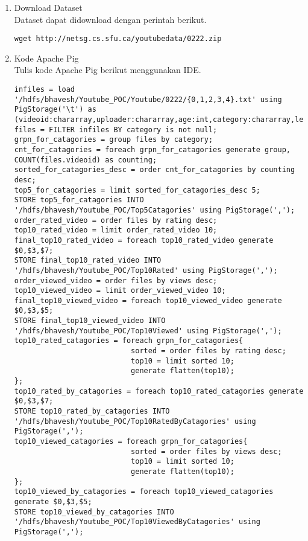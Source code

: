 \documentclass[a4paper]{tufte-handout}
\begin{document}
\begin{enumerate}
\item Download Dataset \\
Dataset dapat didownload dengan perintah berikut.

{\tt wget http://netsg.cs.sfu.ca/youtubedata/0222.zip}

\item Kode Apache Pig \\
Tulis kode Apache Pig berikut menggunakan IDE.

\begin{lstlisting}
infiles = load '/hdfs/bhavesh/Youtube_POC/Youtube/0222/{0,1,2,3,4}.txt' using PigStorage('\t') as 
(videoid:chararray,uploader:chararray,age:int,category:chararray,length:int,views:int,rate:int,rating:int,comments:int,related_id:chararray);
files = FILTER infiles BY category is not null;
grpn_for_catagories = group files by category;
cnt_for_catagories = foreach grpn_for_catagories generate group, COUNT(files.videoid) as counting;
sorted_for_catagories_desc = order cnt_for_catagories by counting desc;
top5_for_catagories = limit sorted_for_catagories_desc 5;
STORE top5_for_catagories INTO  '/hdfs/bhavesh/Youtube_POC/Top5Catagories' using PigStorage(',');
order_rated_video = order files by rating desc;
top10_rated_video = limit order_rated_video 10;
final_top10_rated_video = foreach top10_rated_video generate $0,$3,$7;
STORE final_top10_rated_video INTO '/hdfs/bhavesh/Youtube_POC/Top10Rated' using PigStorage(',');
order_viewed_video = order files by views desc;
top10_viewed_video = limit order_viewed_video 10;
final_top10_viewed_video = foreach top10_viewed_video generate $0,$3,$5;
STORE final_top10_viewed_video INTO '/hdfs/bhavesh/Youtube_POC/Top10Viewed' using PigStorage(',');
top10_rated_catagories = foreach grpn_for_catagories{
                           sorted = order files by rating desc;
                           top10 = limit sorted 10;
                           generate flatten(top10);
};
top10_rated_by_catagories = foreach top10_rated_catagories generate $0,$3,$7;
STORE top10_rated_by_catagories INTO '/hdfs/bhavesh/Youtube_POC/Top10RatedByCatagories' using PigStorage(',');
top10_viewed_catagories = foreach grpn_for_catagories{
                           sorted = order files by views desc;
                           top10 = limit sorted 10;
                           generate flatten(top10);
};
top10_viewed_by_catagories = foreach top10_viewed_catagories generate $0,$3,$5;
STORE top10_viewed_by_catagories INTO '/hdfs/bhavesh/Youtube_POC/Top10ViewedByCatagories' using PigStorage(',');
\end{lstlisting}


\end{enumerate}
\end{document}
